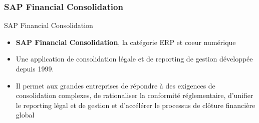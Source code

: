 \documentclass{beamer}
\begin{document}
        \begin{frame}
            \frametitle{SAP Financial Consolidation}
            \begin{block}{SAP Financial Consolidation}
            \begin{itemize}
                \item \textbf{SAP Financial Consolidation}, la catégorie ERP et coeur numérique
                \item Une application de consolidation légale et de reporting de gestion développée depuis 1999.
                \item Il permet aux grandes entreprises de répondre à des exigences de consolidation complexes, de rationaliser la conformité réglementaire, d’unifier le reporting légal et de gestion et d’accélérer le processus de clôture financière global
            \end{itemize}
            
            \end{block}
        \end{frame}
        
\end{document}
